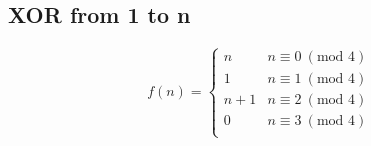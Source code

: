 \subsection{XOR from 1 to n}
$$
f(n) = \begin{cases}
    n & n \equiv 0\ (\text{mod } 4)\\
    1 & n \equiv 1\ (\text{mod } 4)\\
    n+1 & n \equiv 2\ (\text{mod } 4)\\
    0 & n \equiv 3\ (\text{mod } 4)\\
\end{cases}
$$
